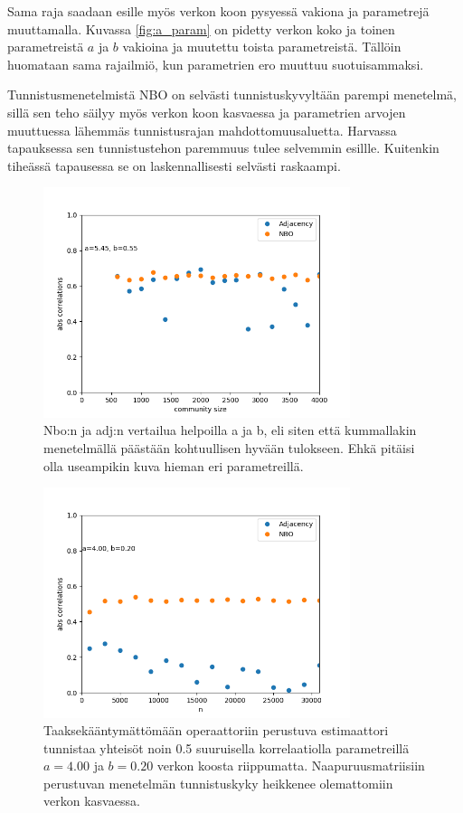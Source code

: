 \documentclass[finnish,12pt,a4paper,pdftex,sci,utf8]{aaltothesis}
\begin{document}
Sama raja saadaan esille myös verkon koon pysyessä vakiona ja parametrejä muuttamalla. Kuvassa \ref{fig:a_param} on pidetty verkon koko ja toinen parametreistä $a$ ja $b$ vakioina ja muutettu toista parametreistä. Tällöin huomataan sama rajailmiö, kun parametrien ero muuttuu suotuisammaksi.

Tunnistusmenetelmistä NBO on selvästi tunnistuskyvyltään parempi menetelmä, sillä sen teho säilyy myös verkon koon kasvaessa ja parametrien arvojen muuttuessa lähemmäs tunnistusrajan mahdottomuusaluetta. Harvassa tapauksessa sen tunnistustehon paremmuus tulee selvemmin esillle. Kuitenkin tiheässä tapausessa se on laskennallisesti selvästi raskaampi.

\begin{figure}
	\centering
	\includegraphics[width = 0.8\textwidth]{adj_nbo_sp_easy.png}
	\caption{Nbo:n ja adj:n vertailua helpoilla a ja b, eli siten että kummallakin menetelmällä päästään kohtuullisen hyvään tulokseen. Ehkä pitäisi olla useampikin kuva hieman eri parametreillä.}
	\label{fig:adj_nbo_sp_easy}
\end{figure}

\begin{figure}
	\label{fig:adj_nbo_sp_hard}
	\centering
		\includegraphics[width = 0.8\textwidth]{adj_nbo_hard_presentation.png}
		\caption{Taaksekääntymättömään operaattoriin perustuva estimaattori tunnistaa yhteisöt noin 0.5 suuruisella korrelaatiolla parametreillä $a = 4.00$ ja $b = 0.20$ verkon koosta riippumatta. Naapuruusmatriisiin perustuvan menetelmän tunnistuskyky heikkenee olemattomiin verkon kasvaessa.}
\end{figure}
\end{document}
